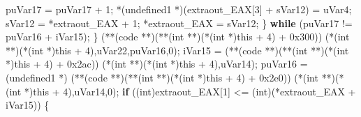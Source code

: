 \documentclass[
]{article}
\newenvironment{Shaded}{}{}
\newcommand{\BaseNTok}[1]{\textcolor[rgb]{0.25,0.63,0.44}{#1}}
\newcommand{\ControlFlowTok}[1]{\textcolor[rgb]{0.00,0.44,0.13}{\textbf{#1}}}
\newcommand{\DataTypeTok}[1]{\textcolor[rgb]{0.56,0.13,0.00}{#1}}
\newcommand{\DecValTok}[1]{\textcolor[rgb]{0.25,0.63,0.44}{#1}}
\newcommand{\NormalTok}[1]{#1}
\newcommand{\OperatorTok}[1]{\textcolor[rgb]{0.40,0.40,0.40}{#1}}
\begin{document}
\begin{Shaded}
\begin{Highlighting}[]
\NormalTok{          puVar17 }\OperatorTok{=}\NormalTok{ puVar17 }\OperatorTok{+} \DecValTok{1}\OperatorTok{;}
          \OperatorTok{*(}\NormalTok{undefined1 }\OperatorTok{*)(}\NormalTok{extraout\_EAX}\OperatorTok{[}\DecValTok{3}\OperatorTok{]} \OperatorTok{+}\NormalTok{ sVar12}\OperatorTok{)} \OperatorTok{=}\NormalTok{ uVar4}\OperatorTok{;}
\NormalTok{          sVar12 }\OperatorTok{=} \OperatorTok{*}\NormalTok{extraout\_EAX }\OperatorTok{+} \DecValTok{1}\OperatorTok{;}
          \OperatorTok{*}\NormalTok{extraout\_EAX }\OperatorTok{=}\NormalTok{ sVar12}\OperatorTok{;}
        \OperatorTok{\}} \ControlFlowTok{while} \OperatorTok{(}\NormalTok{puVar17 }\OperatorTok{!=}\NormalTok{ puVar16 }\OperatorTok{+}\NormalTok{ iVar15}\OperatorTok{);}
      \OperatorTok{\}}
      \OperatorTok{(**(}\NormalTok{code }\OperatorTok{**)(**(}\DataTypeTok{int} \OperatorTok{**)(*(}\DataTypeTok{int} \OperatorTok{*)}\NormalTok{this }\OperatorTok{+} \DecValTok{4}\OperatorTok{)} \OperatorTok{+} \BaseNTok{0x300}\OperatorTok{))}
                \OperatorTok{(*(}\DataTypeTok{int} \OperatorTok{**)(*(}\DataTypeTok{int} \OperatorTok{*)}\NormalTok{this }\OperatorTok{+} \DecValTok{4}\OperatorTok{),}\NormalTok{uVar22}\OperatorTok{,}\NormalTok{puVar16}\OperatorTok{,}\DecValTok{0}\OperatorTok{);}
\NormalTok{      iVar15 }\OperatorTok{=} \OperatorTok{(**(}\NormalTok{code }\OperatorTok{**)(**(}\DataTypeTok{int} \OperatorTok{**)(*(}\DataTypeTok{int} \OperatorTok{*)}\NormalTok{this }\OperatorTok{+} \DecValTok{4}\OperatorTok{)} \OperatorTok{+} \BaseNTok{0x2ac}\OperatorTok{))}
                         \OperatorTok{(*(}\DataTypeTok{int} \OperatorTok{**)(*(}\DataTypeTok{int} \OperatorTok{*)}\NormalTok{this }\OperatorTok{+} \DecValTok{4}\OperatorTok{),}\NormalTok{uVar14}\OperatorTok{);}
\NormalTok{      puVar16 }\OperatorTok{=} \OperatorTok{(}\NormalTok{undefined1 }\OperatorTok{*)}
                \OperatorTok{(**(}\NormalTok{code }\OperatorTok{**)(**(}\DataTypeTok{int} \OperatorTok{**)(*(}\DataTypeTok{int} \OperatorTok{*)}\NormalTok{this }\OperatorTok{+} \DecValTok{4}\OperatorTok{)} \OperatorTok{+} \BaseNTok{0x2e0}\OperatorTok{))}
                          \OperatorTok{(*(}\DataTypeTok{int} \OperatorTok{**)(*(}\DataTypeTok{int} \OperatorTok{*)}\NormalTok{this }\OperatorTok{+} \DecValTok{4}\OperatorTok{),}\NormalTok{uVar14}\OperatorTok{,}\DecValTok{0}\OperatorTok{);}
      \ControlFlowTok{if} \OperatorTok{((}\DataTypeTok{int}\OperatorTok{)}\NormalTok{extraout\_EAX}\OperatorTok{[}\DecValTok{1}\OperatorTok{]} \OperatorTok{\textless{}=} \OperatorTok{(}\DataTypeTok{int}\OperatorTok{)(*}\NormalTok{extraout\_EAX }\OperatorTok{+}\NormalTok{ iVar15}\OperatorTok{))} \OperatorTok{\{}

\end{Highlighting}
\end{Shaded}
\end{document}
